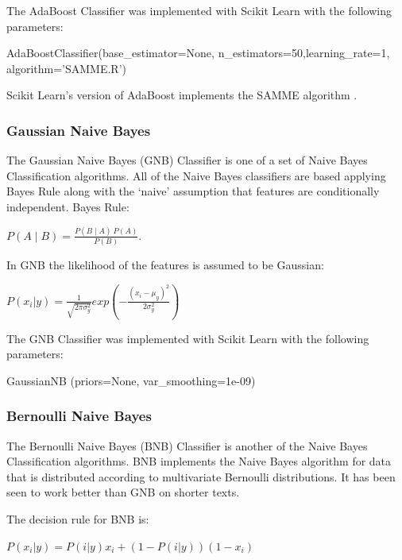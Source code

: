 The AdaBoost Classifier was implemented with Scikit Learn with the following parameters:

\begin{tcolorbox}
\begin{center}
	AdaBoostClassifier(base\_estimator=None, n\_estimators=50,learning\_rate=1, algorithm=’SAMME.R’)
\end{center}
\end{tcolorbox}

Scikit Learn's version of AdaBoost implements the SAMME algorithm \cite{multiclassada2009}.

\subsubsection*{Gaussian Naive Bayes}

The Gaussian Naive Bayes (GNB) Classifier is one of a set of Naive Bayes Classification algorithms. All of the Naive Bayes classifiers are based applying Bayes Rule along with the ‘naive’ assumption that features are conditionally independent. Bayes Rule: 
\begin{center}
\(P(A\mid B)=\frac{P(B\mid A)\:P(A)}{P(B)}\). 
\end{center}
In GNB the likelihood of the features is assumed to be Gaussian:
\begin{center}
$P(x_i|y) = \frac{1}{\sqrt{2\pi\sigma_y^2}} exp (- \frac{(x_i - \mu_y)^2}{2\sigma_y^2})$
\end{center}
The GNB Classifier was implemented with Scikit Learn with the following parameters:

\begin{tcolorbox}
\begin{center}
	GaussianNB (priors=None, var\_smoothing=1e-09)
\end{center}
\end{tcolorbox}

\subsubsection*{Bernoulli Naive Bayes}

The Bernoulli Naive Bayes (BNB) Classifier is another of the Naive Bayes Classification algorithms. BNB implements the Naive Bayes algorithm for data that is distributed according to multivariate Bernoulli distributions. It has been seen to work better than GNB on shorter texts.

The decision rule for BNB is:
\begin{center}
$P(x_i|y) = P(i|y)x_i + (1 - P(i|y))(1 - x_i)$
\end{center}

